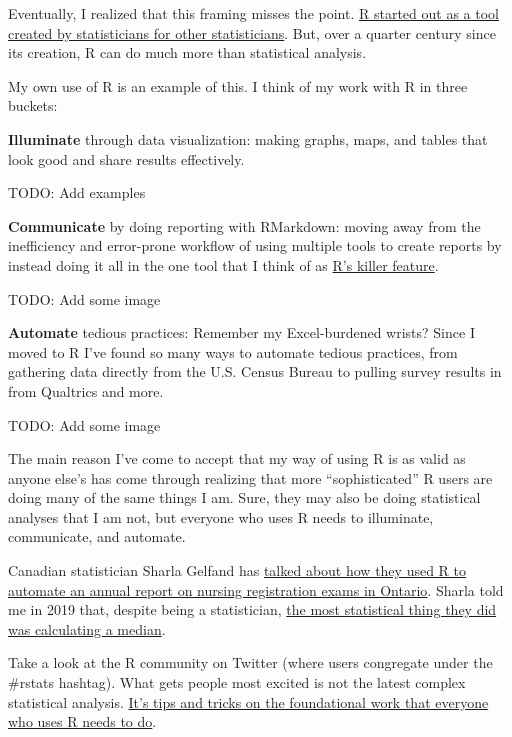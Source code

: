 \documentclass[
]{book}
\begin{document}
Eventually, I realized that this framing misses the point. \href{https://rss.onlinelibrary.wiley.com/doi/10.1111/j.1740-9713.2018.01169.x}{R started out as a tool created by statisticians for other statisticians}. But, over a quarter century since its creation, R can do much more than statistical analysis.

My own use of R is an example of this. I think of my work with R in three buckets:

\textbf{Illuminate} through data visualization: making graphs, maps, and tables that look good and share results effectively.

TODO: Add examples

\textbf{Communicate} by doing reporting with RMarkdown: moving away from the inefficiency and error-prone workflow of using multiple tools to create reports by instead doing it all in the one tool that I think of as \href{https://rfortherestofus.com/2019/03/r-killer-feature-rmarkdown/}{R's killer feature}.

TODO: Add some image

\textbf{Automate} tedious practices: Remember my Excel-burdened wrists? Since I moved to R I've found so many ways to automate tedious practices, from gathering data directly from the U.S. Census Bureau to pulling survey results in from Qualtrics and more.

TODO: Add some image

The main reason I've come to accept that my way of using R is as valid as anyone else's has come through realizing that more ``sophisticated'' R users are doing many of the same things I am. Sure, they may also be doing statistical analyses that I am not, but everyone who uses R needs to illuminate, communicate, and automate.

Canadian statistician Sharla Gelfand has \href{https://twitter.com/sharlagelfand/status/1135962094938009601}{talked about how they used R to automate an annual report on nursing registration exams in Ontario}. Sharla told me in 2019 that, despite being a statistician, \href{https://rfortherestofus.com/2019/09/my-r-journey-sharla-gelfand/}{the most statistical thing they did was calculating a median}.

Take a look at the R community on Twitter (where users congregate under the \#rstats hashtag). What gets people most excited is not the latest complex statistical analysis. \href{https://twitter.com/dgkeyes/status/1479473689225695234}{It's tips and tricks on the foundational work that everyone who uses R needs to do}.
\end{document}
